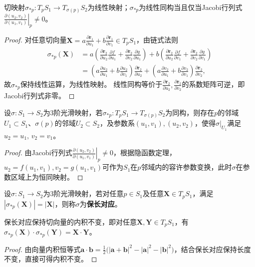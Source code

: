 \documentclass[../../main.tex]{subfiles}%
\begin{document}
\begin{proposition}
切映射$\sigma_{*p}:T_pS_1\to T_{\sigma(p)}S_2$为线性映射；$\sigma_{*p}$为线性同构当且仅当Jacobi行列式$\left.\frac{\partial(u_2,v_2)}{\partial(u_1,v_1)}\right|_p\neq0$。
\end{proposition}
\begin{proof}
对任意切向量$\boldsymbol{X}=a\frac{\partial\boldsymbol{r}_1}{\partial u_1}+b\frac{\partial\boldsymbol{r}_1}{\partial v_1}\in T_pS_1$，由链式法则
\begin{align*}
\sigma_{*p}(\boldsymbol{X})&=a\left(\frac{\partial\boldsymbol{r}_2}{\partial u_2}\frac{\partial f}{\partial u_1}+\frac{\partial\boldsymbol{r}_2}{\partial v_2}\frac{\partial g}{\partial u_1}\right)+b\left(\frac{\partial\boldsymbol{r}_2}{\partial u_2}\frac{\partial f}{\partial v_1}+\frac{\partial\boldsymbol{r}_2}{\partial v_2}\frac{\partial g}{\partial v_1}\right)\\
&=\left(a\frac{\partial u_2}{\partial u_1}+b\frac{\partial u_2}{\partial v_1}\right)\frac{\partial\boldsymbol{r}_2}{\partial u_2}+\left(a\frac{\partial v_2}{\partial u_1}+b\frac{\partial v_2}{\partial v_1}\right)\frac{\partial\boldsymbol{r}_2}{\partial v_2},
\end{align*}
故$\sigma_{*p}$保持线性运算，为线性映射。
线性同构等价于$\frac{\partial\boldsymbol{r}_2}{\partial u_2},\frac{\partial\boldsymbol{r}_2}{\partial v_2}$的系数矩阵可逆，即Jacobi行列式非零。
\end{proof}

\begin{theorem}
设$\sigma:S_1\to S_2$为3阶光滑映射，若$\sigma_{*p}:T_pS_1\to T_{\sigma(p)}S_2$为同构，则存在$p$的邻域$U_1\subset S_1$、$\sigma(p)$的邻域$U_2\subset S_2$，及参数系$(u_1,v_1),(u_2,v_2)$，使得$\sigma|_{U_1}$满足$u_2=u_1,\,v_2=v_1$。
\end{theorem}
\begin{proof}
由Jacobi行列式$\left.\frac{\partial(u_2,v_2)}{\partial(u_1,v_1)}\right|_p\neq0$，根据隐函数定理，$u_2=f(u_1,v_1),v_2=g(u_1,v_1)$可作为$S_1$在$p$邻域内的容许参数变换，此时$\sigma$在参数区域上为恒同映射。
\end{proof}

\begin{definition}
设$\sigma:S_1\to S_2$为3阶光滑映射，若对任意$p\in S_1$及任意$\boldsymbol{X}\in T_pS_1$，满足$|\sigma_{*p}(\boldsymbol{X})|=|\boldsymbol{X}|$，则称$\sigma$为\textbf{保长对应}。
\end{definition}

\begin{proposition}
保长对应保持切向量的内积不变，即对任意$\boldsymbol{X},\boldsymbol{Y}\in T_pS_1$，有$\sigma_{*p}(\boldsymbol{X})\cdot\sigma_{*p}(\boldsymbol{Y})=\boldsymbol{X}\cdot\boldsymbol{Y}$。
\end{proposition}
\begin{proof}
由向量内积恒等式$\boldsymbol{a}\cdot\boldsymbol{b}=\frac{1}{2}\big(|\boldsymbol{a}+\boldsymbol{b}|^2-|\boldsymbol{a}|^2-|\boldsymbol{b}|^2\big)$，结合保长对应保持长度不变，直接可得内积不变。
\end{proof}
\end{document}
